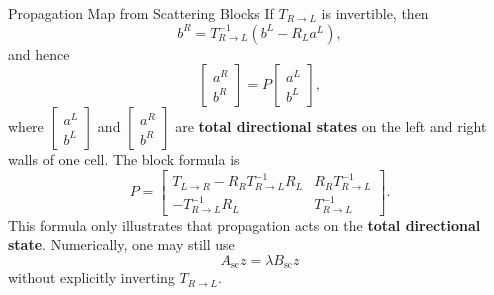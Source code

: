 \documentclass[aspectratio=169]{beamer}
\begin{document}
\begin{frame}{Propagation Map from Scattering Blocks}
  \footnotesize
  If \(T_{R\to L}\) is invertible, then
  \[
    b^R=T_{R\to L}^{-1}(b^L-R_La^L),
  \]
  and hence
  \[
    \begin{bmatrix}a^R\\b^R\end{bmatrix}
    =
    P
    \begin{bmatrix}a^L\\b^L\end{bmatrix},
  \]
  where \(\begin{bmatrix}a^L\\b^L\end{bmatrix}\) and
  \(\begin{bmatrix}a^R\\b^R\end{bmatrix}\) are \textbf{total directional
  states} on the left and right walls of one cell.
  The block formula is
  \[
    P=
    \begin{bmatrix}
      T_{L\to R}-R_RT_{R\to L}^{-1}R_L
      &
      R_RT_{R\to L}^{-1}
      \\
      -T_{R\to L}^{-1}R_L
      &
      T_{R\to L}^{-1}
    \end{bmatrix}.
  \]
  This formula only illustrates that propagation acts on the
  \textbf{total directional state}.  Numerically, one may still use
  \[
    A_{\mathrm{sc}}z=\lambda B_{\mathrm{sc}}z
  \]
  without explicitly inverting \(T_{R\to L}\).
\end{frame}
\end{document}
